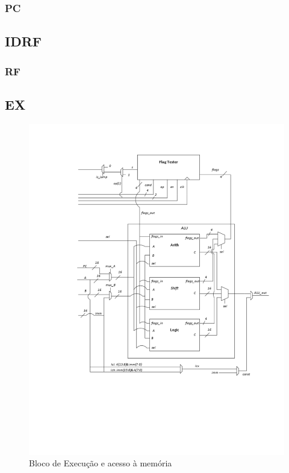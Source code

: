\documentclass[a4paper]{article}
\begin{document}
			\subsubsection{PC}
		
		\subsection{IDRF}
			
			
			
			
			
			\subsubsection{RF}
			
		\subsection{EX}
		
			\begin{figure}[H]
				\centering	
				\includegraphics[width=\textwidth]{ex}
				\caption{Bloco de Execução e acesso à memória}
				\label{fig:ex}
			\end{figure}
		
\end{document}

